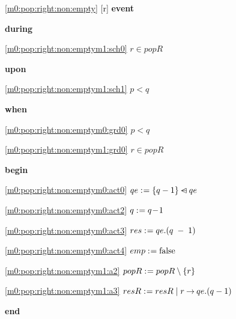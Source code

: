 \noindent \ref{m0:pop:right:non:empty} [r] \textbf{event}
\begin{block}
  \item   \textbf{during}
  \begin{block}
  \item[ \eqref{m0:pop:right:non:emptym1:sch0} ]$r \in popR $ %
  \end{block}
  \item   \textbf{upon}
  \begin{block}
  \item[ \eqref{m0:pop:right:non:emptym1:sch1} ]$p < q $ %
  \end{block}
  \item   \textbf{when}
  \begin{block}
  \item[ \eqref{m0:pop:right:non:emptym0:grd0} ]$p < q $ %
  \item[ \eqref{m0:pop:right:non:emptym1:grd0} ]$r \in popR $ %
  \end{block}
  \item   \textbf{begin}
  \begin{block}
  \item[ \eqref{m0:pop:right:non:emptym0:act0} ]$qe \mathrel{:\mkern1mu=} \{ q-1 \} \mathbin{\lhd\mkern-14mu-} qe $ %
  \item[ \eqref{m0:pop:right:non:emptym0:act2} ]$q \mathrel{:\mkern1mu=} q\! - \!1 $ %
  \item[ \eqref{m0:pop:right:non:emptym0:act3} ]$res \mathrel{:\mkern1mu=} qe.(q\; - \;1) $ %
  \item[ \eqref{m0:pop:right:non:emptym0:act4} ]$emp \mathrel{:\mkern1mu=} \text{false} $ %
  \item[ \eqref{m0:pop:right:non:emptym1:a2} ]$popR \mathrel{:\mkern1mu=} popR \setminus \{ r \} $ %
  \item[ \eqref{m0:pop:right:non:emptym1:a3} ]$resR \mathrel{:\mkern1mu=} resR \; | \; r \mathbin\rightarrow qe.(q-1) $ %
  \end{block}
  \item   \textbf{end} \\
\end{block}
